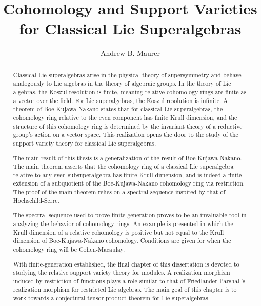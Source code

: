\documentclass[12pt]{report}
\title{Cohomology and Support Varieties\\
  for Classical Lie Superalgebras}
\author{Andrew B. Maurer}
\begin{document}

\begin{abstract}
  Classical Lie superalgebras arise in the physical theory of supersymmetry and behave analogously to Lie algebras in the theory of algebraic groups. In the theory of Lie algebras, the Koszul resolution is finite, meaning relative cohomology rings are finite as a vector over the field. For Lie superalgebras, the Koszul resolution is infinite. A theorem of Boe-Kujawa-Nakano states that for classical Lie superalgebras, the cohomology ring relative to the even component has finite Krull dimension, and the structure of this cohomology ring is determined by the invariant theory of a reductive group's action on a vector space. This realization opens the door to the study of the support variety theory for classical Lie superalgebras.
  
  The main result of this thesis is a generalization of the result of Boe-Kujawa-Nakano. The main theorem asserts that the cohomology ring of a classical Lie superalgebra relative to any even subsuperalgebra has finite Krull dimension, and is indeed a finite extension of a subquotient of the Boe-Kujawa-Nakano cohomology ring via restriction. The proof of the main theorem relies on a spectral sequence inspired by that of Hochschild-Serre.

  The spectral sequence used to prove finite generation proves to be an invaluable tool in analyzing the behavior of cohomology rings. An example is presented in which the Krull dimension of a relative cohomology is positive but not equal to the Krull dimension of Boe-Kujawa-Nakano cohomology. Conditions are given for when the cohomology ring will be Cohen-Macaulay.

  With finite-generation established, the final chapter of this dissertation is devoted to studying the relative support variety theory for modules. A realization morphism induced by restriction of functions plays a role similar to that of Friedlander-Parshall's realization morphism for restricted Lie algebras. The main goal of this chapter is to work towards a conjectural tensor product theorem for Lie superalgebras.




\end{abstract}
\end{document}
